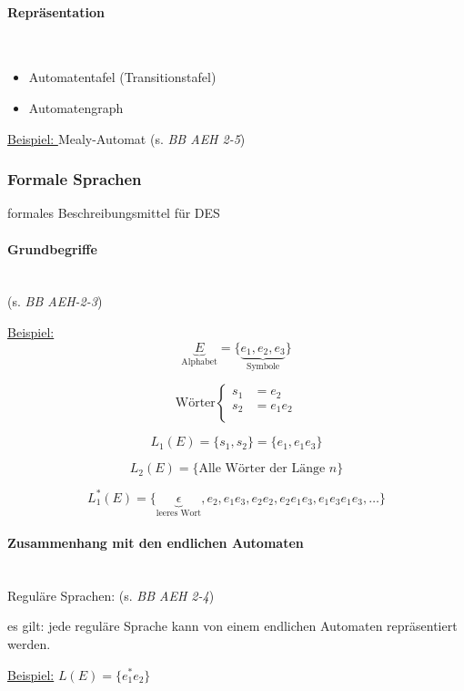 \documentclass[12pt,a4paper]{scrartcl}
\numberwithin{equation}{section}
\newcommand{\properparagraph}[1]{\paragraph{#1}\mbox{}\\}
\begin{document}
\properparagraph{Repräsentation}
\begin{itemize}
	\item Automatentafel (Transitionstafel)
	\item Automatengraph 
\end{itemize}

\underline{Beispiel: } Mealy-Automat (s. \textit{BB AEH 2-5})

\subsubsection{Formale Sprachen}
formales Beschreibungsmittel für DES

\properparagraph{Grundbegriffe}
(s. \textit{BB AEH-2-3})

\underline{Beispiel:}
\begin{equation}
	\underbrace{E}_\text{Alphabet} = \{\underbrace{e_1, e_2, e_3}_\text{Symbole}\}
\end{equation}

\begin{equation}
\text{Wörter}\left\{
\begin{aligned}
s_1 &= e_2 \\
s_2 &= e_1 e_2 \\
\end{aligned}
\right.
\end{equation}

\begin{equation}
	L_1(E) = \{s_1, s_2\} = \{e_1, e_1 e_3\} 
\end{equation}

\begin{equation}
	L_2(E) = \{ \text{Alle Wörter der Länge } n \}
\end{equation}

\begin{equation}
	L_1^{\ast}(E) = \{ \underbrace{\epsilon}_\text{leeres Wort}, e_2, e_1 e_3, e_2 e_2, e_2 e_1 e_3, e_1 e_3 e_1 e_3, \ldots \}
\end{equation}

\properparagraph{Zusammenhang mit den endlichen Automaten}
Reguläre Sprachen: (s. \textit{BB AEH 2-4})

es gilt: jede reguläre Sprache kann von einem endlichen Automaten repräsentiert werden.

\underline{Beispiel:} $L(E) = \{e_1^{\ast} e_2\}$
\end{document}
